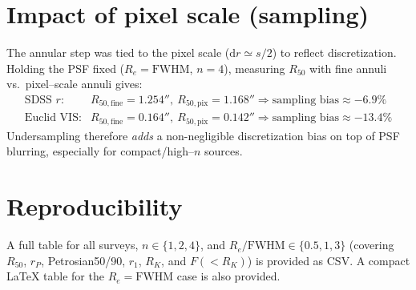 \documentclass[12pt]{article}
\begin{document}
\section*{Impact of pixel scale (sampling)}
The annular step was tied to the pixel scale ($\mathrm{d}r\simeq s/2$) to reflect discretization. Holding the PSF fixed ($R_e=\mathrm{FWHM}$, $n{=}4$), measuring $R_{50}$ with fine annuli vs.\ pixel–scale annuli gives:
\[
\begin{array}{lcl}
\text{SDSS }r: & R_{50,\mathrm{fine}}=1.254'',\ R_{50,\mathrm{pix}}=1.168'' \Rightarrow \text{sampling bias}\approx -6.9\%\\
\text{Euclid VIS}: & R_{50,\mathrm{fine}}=0.164'',\ R_{50,\mathrm{pix}}=0.142'' \Rightarrow \text{sampling bias}\approx -13.4\% 
\end{array}
\]
Undersampling therefore \emph{adds} a non-negligible discretization bias on top of PSF blurring, especially for compact/high–$n$ sources.

\section*{Reproducibility}
A full table for all surveys, $n\in\{1,2,4\}$, and $R_e/\mathrm{FWHM}\in\{0.5,1,3\}$ (covering $R_{50}$, $r_P$, Petrosian50/90, $r_1$, $R_K$, and $F(<R_K)$) is provided as CSV. A compact {\LaTeX} table for the $R_e=\mathrm{FWHM}$ case is also provided.
\end{document}
